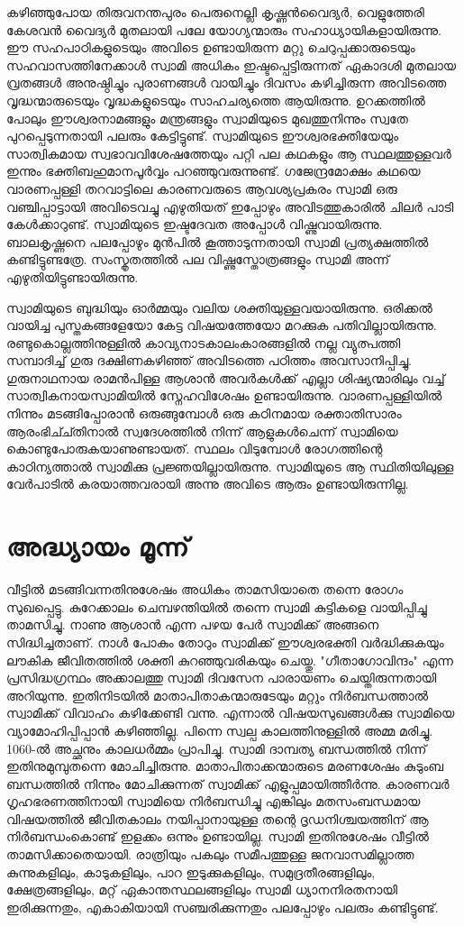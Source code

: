 \documentclass[12pt,openany]{book}
\begin{document}
	കഴിഞ്ഞുപോയ തിരുവനന്തപുരം പെരുനെല്ലി കൃഷ്ണൻവൈദ്യർ, വെളുത്തേരി കേശവൻ വൈദ്യർ മുതലായി പലേ യോഗ്യന്മാരും സഹാധ്യായികളായിരുന്നു. ഈ സഹപാഠികളുടെയും അവിടെ ഉണ്ടായിരുന്ന മറ്റു ചെറുപ്പക്കാരുടെയും സഹവാസത്തിനേക്കാൾ സ്വാമി അധികം ഇഷ്ടപ്പെട്ടിരുന്നത് ഏകാദശി മുതലായ വ്രതങ്ങൾ അനുഷ്ഠിച്ചും പുരാണങ്ങൾ വായിച്ചും ദിവസം കഴിച്ചിരുന്ന അവിടത്തെ വൃദ്ധന്മാരുടെയും വൃദ്ധകളുടെയും സാഹചര്യത്തെ ആയിരുന്നു. ഉറക്കത്തിൽ പോലും ഈശ്വരനാമങ്ങളും മന്ത്രങ്ങളും സ്വാമിയുടെ മുഖത്തുനിന്നും സ്വതേ പുറപ്പെടുന്നതായി പലരും കേട്ടിട്ടുണ്ട്. സ്വാമിയുടെ ഈശ്വരഭക്തിയേയും സാത്വികമായ സ്വഭാവവിശേഷത്തേയും പറ്റി പല കഥകളും ആ സ്ഥലത്തുള്ളവർ ഇന്നും ഭക്തിബഹുമാനപൂർവ്വം പറഞ്ഞുവരുന്നുണ്ട്. ഗജേന്ദ്രമോക്ഷം കഥയെ വാരണപ്പള്ളി തറവാട്ടിലെ കാരണവരുടെ ആവശ്യപ്രകരം സ്വാമി ഒരു വഞ്ചിപ്പാട്ടായി അവിടെവച്ചു എഴുതിയത് ഇപ്പോഴും അവിടത്തുകാരിൽ ചിലർ പാടി കേൾക്കാറുണ്ട്. സ്വാമിയുടെ ഇഷ്ടദേവത അപ്പോൾ വിഷ്ണുവായിരുന്നു. ബാലകൃഷ്ണനെ പലപ്പോഴും മുൻപിൽ കൂത്താടുന്നതായി സ്വാമി പ്രത്യക്ഷത്തിൽ കണ്ടിട്ടുണ്ടത്രേ. സംസ്കൃതത്തിൽ പല വിഷ്ണുസ്തോത്രങ്ങളും സ്വാമി അന്ന് എഴുതിയിട്ടുണ്ടായിരുന്നു.
	
	സ്വാമിയുടെ ബുദ്ധിയും ഓർമ്മയും വലിയ ശക്തിയുള്ളവയായിരുന്നു. ഒരിക്കൽ വായിച്ച പുസ്തകങ്ങളേയോ കേട്ട വിഷയത്തേയോ മറക്കുക പതിവില്ലായിരുന്നു. രണ്ടുകൊല്ലത്തിനുള്ളിൽ കാവ്യനാടകാലംകാരങ്ങളിൽ നല്ല വ്യുത്പത്തി സമ്പാദിച്ച് ഗുരു ദക്ഷിണകഴിഞ്ഞ് അവിടത്തെ പഠിത്തം അവസാനിപ്പിച്ചു. ഗുരുനാഥനായ രാമൻപിള്ള ആശാൻ അവർകൾക്ക് എല്ലാ ശിഷ്യന്മാരിലും വച്ച് സാത്വികനായസ്വാമിയിൽ സ്നേഹവിശേഷം ഉണ്ടായിരുന്നു. വാരണപ്പള്ളിയിൽ നിന്നും മടങ്ങിപ്പോരാൻ ഒരുങ്ങുമ്പോൾ ഒരു കഠിനമായ രക്താതിസാരം ആരംഭിച്ച്തിനാൽ സ്വദേശത്തിൽ നിന്ന് ആളുകൾചെന്ന് സ്വാമിയെ കൊണ്ടുപോരുകയാണുണ്ടായത്. സ്ഥലം വിടുമ്പോൾ രോഗത്തിന്റെ കാഠിന്യത്താൽ സ്വാമിക്കു പ്രജ്ഞയില്ലായിരുന്നു. സ്വാമിയുടെ ആ സ്ഥിതിയിലുള്ള വേർപാടിൽ കരയാത്തവരായി അന്നു അവിടെ ആരും ഉണ്ടായിരുന്നില്ല.
	
	\newpage
	
	\chapter*{അദ്ധ്യായം മൂന്ന്}
	
	വീട്ടിൽ മടങ്ങിവന്നതിനുശേഷം അധികം താമസിയാതെ തന്നെ രോഗം സുഖപ്പെട്ടു. കുറേക്കാലം ചെമ്പഴന്തിയിൽ തന്നെ സ്വാമി കുട്ടികളെ വായിപ്പിച്ചു താമസിച്ചു. നാണു ആശാൻ എന്ന പഴയ പേർ സ്വാമിക്ക് അങ്ങനെ സിദ്ധിച്ചതാണ്. നാൾ പോകും തോറും സ്വാമിക്ക് ഈശ്വരഭക്തി വർദ്ധിക്കുകയും ലൗകിക ജീവിതത്തിൽ ശക്തി കുറഞ്ഞുവരികയും ചെയ്തു. "ഗീതാഗോവിന്ദം" എന്ന പ്രസിദ്ധഗ്രന്ഥം അക്കാലത്തു സ്വാമി ദിവസേന പാരായണം ചെയ്തിരുന്നതായി അറിയുന്നു. ഇതിനിടയിൽ മാതാപിതാകന്മാരുടേയും മറ്റും നിർബന്ധത്താൽ സ്വാമിക്ക് വിവാഹം കഴിക്കേണ്ടി വന്നു. എന്നാൽ വിഷയസുഖങ്ങൾക്കു സ്വാമിയെ വ്യാമോഹിപ്പിപ്പാൻ കഴിഞ്ഞില്ല. പിന്നെ സ്വല്പ കാലത്തിനുള്ളിൽ അമ്മ മരിച്ചു. 1060-ൽ അച്ഛനും കാലധർമ്മം പ്രാപിച്ചു. സ്വാമി ദാമ്പത്യ ബന്ധത്തിൽ നിന്ന് ഇതിനുമുമ്പുതന്നെ മോചിച്ചിരുന്നു. മാതാപിതാക്കന്മാരുടെ മരണശേഷം കുടുംബ ബന്ധത്തിൽ നിന്നും മോചിക്കുന്നത് സ്വാമിക്ക് എളുപ്പമായിത്തീർന്നു. കാരണവർ ഗൃഹഭരണത്തിനായി സ്വാമിയെ നിർബന്ധിച്ചു എങ്കിലും മതസംബന്ധമായ വിഷയത്തിൽ ജീവിതകാലം നയിപ്പാനായുള്ള തന്റെ ദൃഡനിശ്ചയത്തിന് ആ നിർബന്ധംകൊണ്ട് ഇളക്കം ഒന്നും ഉണ്ടായില്ല. സ്വാമി ഇതിനുശേഷം വീട്ടിൽ താമസിക്കാതെയായി. രാത്രിയും പകലും സമീപത്തുള്ള ജനവാസമില്ലാത്ത കുന്നുകളിലും, കാടുകളിലും, പാറ ഇടുക്കുകളിലും, സമുദ്രതീരങ്ങളിലും, ക്ഷേത്രങ്ങളിലും, മറ്റ് ഏകാന്തസ്ഥലങ്ങളിലും സ്വാമി ധ്യാനനിരതനായി ഇരിക്കുന്നതും, എകാകിയായി സഞ്ചരിക്കുന്നതും പലപ്പോഴും പലരും കണ്ടിട്ടുണ്ട്.
	
\end{document}
